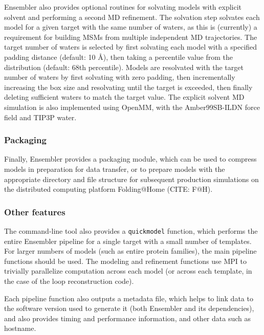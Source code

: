 \documentclass[aps,pre,twocolumn,nofootinbib,superscriptaddress,linenumbers]{revtex4-1}
\begin{document}
Ensembler also provides optional routines for solvating models with explicit
solvent and performing a second MD refinement. The solvation step solvates each
model for a given target with the same number of waters, as this is (currently)
a requirement for building MSMs from multiple independent MD trajectories. The
target number of waters is selected by first solvating each model with a
specified padding distance (default: 10 \AA), then taking a percentile value
from the distribution (default: 68th percentile). Models are resolvated with
the target number of waters by first solvating with zero padding, then
incrementally increasing the box size and resolvating until the target is
exceeded, then finally deleting sufficient waters to match the target value.
The explicit solvent MD simulation is also implemented using OpenMM, with the
Amber99SB-ILDN force field and TIP3P water.

\subsubsection{Packaging}

Finally, Ensembler provides a packaging module, which can be used to compress
models in preparation for data transfer, or to prepare models with the
appropriate directory and file structure for subsequent production simulations
on the distributed computing platform Folding@Home (CITE: F@H).

\subsubsection{Other features}

The command-line tool also provides a {\tt quickmodel} function, which performs
the entire Ensembler pipeline for a single target with a small number of
templates. For larger numbers of models (such as entire protein families), the
main pipeline functions should be used. The modeling and refinement functions
use MPI to trivially parallelize computation across each model (or across each
template, in the case of the loop reconstruction code).

Each pipeline function also outputs a metadata file, which helps to link data
to the software version used to generate it (both Ensembler and its
dependencies), and also provides timing and performance information, and other
data such as hostname.
\end{document}
